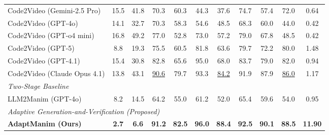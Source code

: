 \begin{table}[t]
\begin{tabular}{lcccccccccc}
Code2Video (Gemini-2.5 Pro) & 15.5 & 41.8 & 70.3 & 60.3 & 44.3 & 37.6 & 74.7 & 57.4 & 72.0 & 0.64 \\
Code2Video (GPT-4o) & 14.1 & 32.7 & 70.3 & 58.3 & 54.6 & 48.5 & 68.3 & 60.0 & 44.0 & 0.42 \\
Code2Video (GPT-o4 mini) & 16.8 & 49.2 & 77.0 & 52.8 & 73.0 & 57.2 & 79.0 & 67.8 & 48.5 & 0.42 \\
Code2Video (GPT-5) & 8.8 & 19.3 & 75.5 & 60.5 & 81.8 & 63.6 & 79.7 & 72.2 & 80.0 & 1.48 \\
Code2Video (GPT-4.1) & 15.4 & 30.8 & 82.8 & 65.6 & 95.0 & 68.0 & 83.7 & 79.0 & 82.0 & 0.94 \\
Code2Video (Claude Opus 4.1) & 13.8 & 43.1 & \underline{90.6} & 79.7 & 93.3 & \underline{84.2} & 91.9 & 87.9 & \underline{86.0} & 1.17 \\
\midrule
\multicolumn{11}{l}{\textit{Two-Stage Baseline}} \\
LLM2Manim (GPT-4o) & 8.2 & 14.5 & 64.2 & 55.0 & 61.2 & 52.0 & 65.4 & 59.6 & 54.0 & 0.95 \\
\midrule
\multicolumn{11}{l}{\textit{Adaptive Generation-and-Verification (Proposed)}} \\
\textbf{AdaptManim (Ours)} & \textbf{2.7} & \textbf{6.6} & \textbf{91.2} & \textbf{82.5} & \textbf{96.0} & \textbf{88.4} & \textbf{92.5} & \textbf{90.1} & \textbf{88.5} & \textbf{11.90} \\
\bottomrule
\end{tabular}
\end{table}